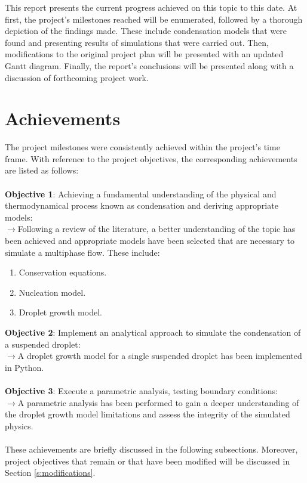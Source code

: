 \documentclass[12pt]{article}
\begin{document}
This report presents the current progress achieved on this topic to this date. At first, the project's milestones reached will be enumerated, followed by a thorough depiction of the findings made. These include condensation models that were found and presenting results of simulations that were carried out. Then, modifications to the original project plan will be presented with an updated Gantt diagram. Finally, the report's conclusions will be presented along with a discussion of forthcoming project work. 



\newpage
\section{Achievements}
The project milestones were consistently achieved within the project’s time frame. With reference to the project objectives, the corresponding achievements are listed as follows:\\\\
\noindent
\textbf{Objective 1}: Achieving a fundamental understanding of the physical and thermodynamical process known as condensation and deriving appropriate models:\\
$\rightarrow$Following a review of the literature, a better understanding of the topic has been achieved and appropriate models have been selected that are necessary to simulate a multiphase flow. These include:
\begin{enumerate}
        \item Conservation equations.
        \item Nucleation model.
        \item Droplet growth model.
\end{enumerate} 
\noindent
\textbf{Objective 2}: Implement an analytical approach to simulate the condensation of a suspended droplet:\\
$\rightarrow$A droplet growth model for a single suspended droplet has been implemented in Python.\\\\
\textbf{Objective 3}: Execute a parametric analysis, testing boundary conditions:\\
$\rightarrow$A parametric analysis has been performed to gain a deeper understanding of the droplet growth model limitations and assess the integrity of the simulated physics.\\\\
\noindent
These achievements are briefly discussed in the following subsections. Moreover, project objectives that remain or that have been modified will be discussed in Section \ref{s:modifications}.
\end{document}
